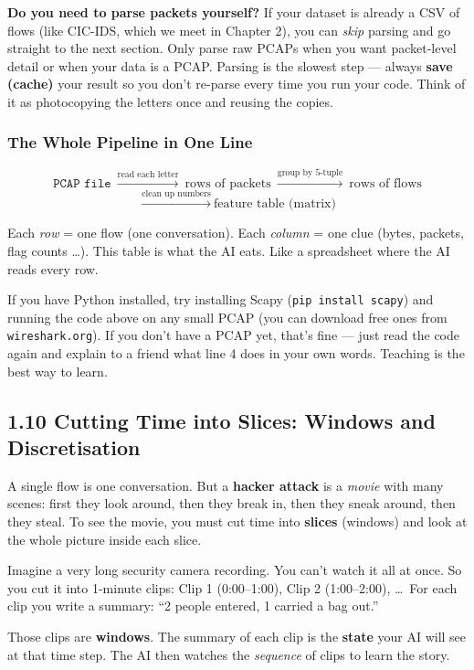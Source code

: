 \documentclass[11pt,a4paper]{article}
\begin{document}
\begin{tipbox}
\textbf{Do you need to parse packets yourself?} If your dataset is already a
CSV of flows (like CIC-IDS, which we meet in Chapter 2), you can \emph{skip}
parsing and go straight to the next section. Only parse raw PCAPs when you
want packet-level detail or when your data is a PCAP. Parsing is the slowest
step --- always \textbf{save (cache)} your result so you don't re-parse every
time you run your code. Think of it as photocopying the letters once and
reusing the copies.
\end{tipbox}

\subsubsection{The Whole Pipeline in One Line}

\[
\texttt{PCAP file} \ \xrightarrow{\text{read each letter}} \ \text{rows of packets}
\ \xrightarrow{\text{group by 5-tuple}} \ \text{rows of flows}
\]
\[
\ \xrightarrow{\text{clean up numbers}} \ \text{feature table (matrix)}
\]

Each \emph{row} = one flow (one conversation). Each \emph{column} = one clue
(bytes, packets, flag counts \dots). This table is what the AI eats. Like a
spreadsheet where the AI reads every row.

\begin{yourturn}
If you have Python installed, try installing Scapy (\texttt{pip install scapy})
and running the code above on any small PCAP (you can download free ones from
\texttt{wireshark.org}). If you don't have a PCAP yet, that's fine --- just
read the code again and explain to a friend what line 4 does in your own words.
Teaching is the best way to learn.
\end{yourturn}

\subsection{1.10 Cutting Time into Slices: Windows and Discretisation}
\label{sec:windowing}

A single flow is one conversation. But a \textbf{hacker attack} is a
\emph{movie} with many scenes: first they look around, then they break in,
then they sneak around, then they steal. To see the movie, you must cut time
into \textbf{slices} (windows) and look at the whole picture inside each slice.

\begin{imaginebox}
Imagine a very long security camera recording. You can't watch it all at once.
So you cut it into 1-minute clips: Clip 1 (0:00--1:00), Clip 2 (1:00--2:00),
\dots\ For each clip you write a summary: ``2 people entered, 1 carried a bag
out.''

Those clips are \textbf{windows}. The summary of each clip is the
\textbf{state} your AI will see at that time step. The AI then watches the
\emph{sequence} of clips to learn the story.
\end{imaginebox}
\end{document}
